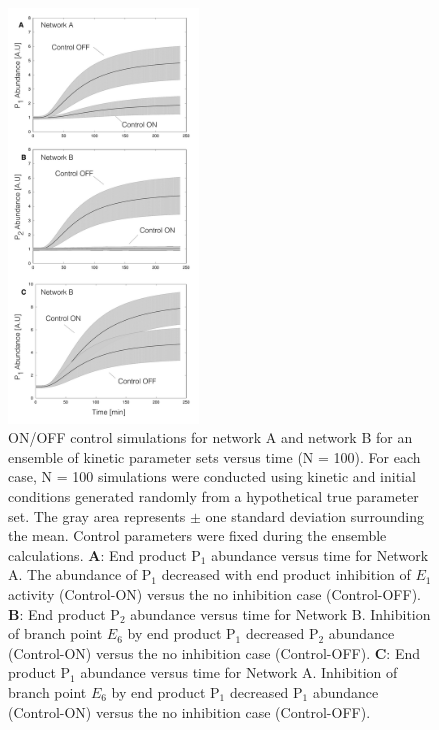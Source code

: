 \documentclass[processes,article,accept,moreauthors,pdftex,12pt,a4paper]{mdpi}
\begin{document}
\begin{figure}[H]
\centering
\includegraphics[width=0.450\textwidth]{./figs/Figure-4-OnOffSimulations.pdf}
\caption{ON/OFF control simulations for network A and network B for an ensemble of kinetic parameter sets versus time (N = 100). 
For each case, N = 100 simulations were conducted using kinetic and initial conditions generated randomly from a hypothetical true parameter set. 
The gray area represents $\pm$ one standard deviation surrounding the mean. 
Control parameters were fixed during the ensemble calculations.
\textbf{A}: End product P$_{1}$ abundance versus time for Network A. 
The abundance of P$_{1}$ decreased with end product inhibition of $E_{1}$ activity (Control-ON) versus the no inhibition case (Control-OFF). 
\textbf{B}: End product P$_{2}$ abundance versus time for Network B. Inhibition of branch point $E_{6}$ by end product P$_{1}$ decreased P$_{2}$ abundance (Control-ON) versus the
no inhibition case (Control-OFF).
\textbf{C}: End product P$_{1}$ abundance versus time for Network A. 
Inhibition of branch point $E_{6}$ by end product P$_{1}$ decreased P$_{1}$ abundance (Control-ON) versus the no inhibition case (Control-OFF).
}\label{fig-onoff-simulations}
\end{figure}
\end{document}
